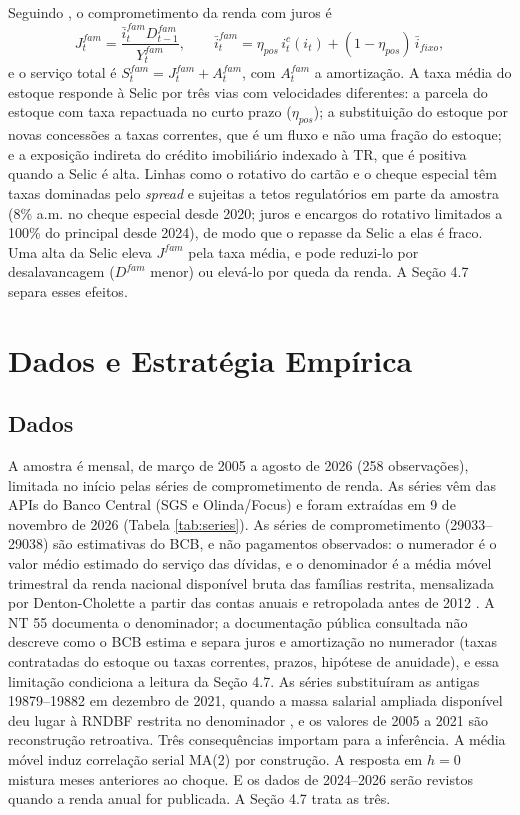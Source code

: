 \documentclass[12pt,a4paper]{article}
\begin{document}
Seguindo \citet{drehmann2015how}, o comprometimento da renda com juros é
\begin{equation}
J_t^{fam} = \frac{\bar{i}_t^{fam} D_{t-1}^{fam}}{Y_t^{fam}}, \qquad \bar{i}_t^{fam} = \eta_{pos}\, i_t^c(i_t) + (1 - \eta_{pos})\, \bar{i}_{fixo},
\label{eq:household_interest}
\end{equation}
e o serviço total é $S_t^{fam} = J_t^{fam} + A_t^{fam}$, com $A_t^{fam}$ a amortização. A taxa média do estoque responde à Selic por três vias com velocidades diferentes: a parcela do estoque com taxa repactuada no curto prazo ($\eta_{pos}$); a substituição do estoque por novas concessões a taxas correntes, que é um fluxo e não uma fração do estoque; e a exposição indireta do crédito imobiliário indexado à TR, que é positiva quando a Selic é alta. Linhas como o rotativo do cartão e o cheque especial têm taxas dominadas pelo \textit{spread} e sujeitas a tetos regulatórios em parte da amostra (8\% a.m. no cheque especial desde 2020; juros e encargos do rotativo limitados a 100\% do principal desde 2024), de modo que o repasse da Selic a elas é fraco. Uma alta da Selic eleva $J^{fam}$ pela taxa média, e pode reduzi-lo por desalavancagem ($D^{fam}$ menor) ou elevá-lo por queda da renda. A Seção 4.7 separa esses efeitos.

\section{Dados e Estratégia Empírica}

\subsection{Dados}

A amostra é mensal, de março de 2005 a agosto de 2026 (258 observações), limitada no início pelas séries de comprometimento de renda. As séries vêm das APIs do Banco Central (SGS e Olinda/Focus) e foram extraídas em 9 de novembro de 2026 (Tabela \ref{tab:series}). As séries de comprometimento (29033--29038) são estimativas do BCB, e não pagamentos observados: o numerador é o valor médio estimado do serviço das dívidas, e o denominador é a média móvel trimestral da renda nacional disponível bruta das famílias restrita, mensalizada por Denton-Cholette a partir das contas anuais e retropolada antes de 2012 \citep{bcb2021nt55}. A NT 55 documenta o denominador; a documentação pública consultada não descreve como o BCB estima e separa juros e amortização no numerador (taxas contratadas do estoque ou taxas correntes, prazos, hipótese de anuidade), e essa limitação condiciona a leitura da Seção 4.7. As séries substituíram as antigas 19879--19882 em dezembro de 2021, quando a massa salarial ampliada disponível deu lugar à RNDBF restrita no denominador \citep{bcb2021notacredito}, e os valores de 2005 a 2021 são reconstrução retroativa. Três consequências importam para a inferência. A média móvel induz correlação serial MA(2) por construção. A resposta em $h = 0$ mistura meses anteriores ao choque. E os dados de 2024--2026 serão revistos quando a renda anual for publicada. A Seção 4.7 trata as três.
\end{document}

